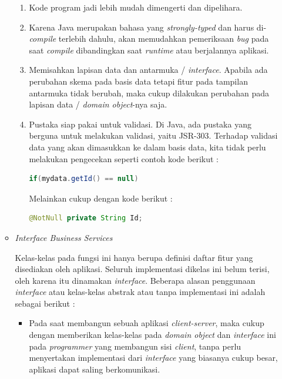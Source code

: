 \begin{enumerate}
\begin{itemize}
    \begin{enumerate}[1)]
      \item Kode program jadi lebih mudah dimengerti dan dipelihara.
      \item Karena Java merupakan bahasa yang \textit{strongly-typed} dan harus di-\textit{compile} terlebih dahulu, akan memudahkan pemeriksaan \textit{bug} pada saat \textit{compile} dibandingkan saat \textit{runtime} atau berjalannya aplikasi.
      \item Memisahkan lapisan data dan antarmuka / \textit{interface}. Apabila ada perubahan skema pada basis data tetapi fitur pada tampilan antarmuka tidak berubah, maka cukup dilakukan perubahan pada lapisan data / \textit{domain object}-nya saja.
      \item Pustaka siap pakai untuk validasi. Di Java, ada pustaka yang berguna untuk melakukan validasi, yaitu JSR-303. Terhadap validasi data yang akan dimasukkan ke dalam basis data, kita tidak perlu melakukan pengecekan seperti contoh kode berikut :
      
      \begin{lstlisting}[language=java]
      if(mydata.getId() == null)
      \end{lstlisting}
      
      Melainkan cukup dengan kode berikut :
      
      \begin{lstlisting}[language=java]
      @NotNull private String Id;
      \end{lstlisting}
    \end{enumerate}
    
    \item \textit{Interface Business Services}
    
    Kelas-kelas pada fungsi ini hanya berupa definisi daftar fitur yang disediakan oleh aplikasi. Seluruh implementasi dikelas ini belum terisi, oleh karena itu dinamakan \textit{interface}. Beberapa alasan penggunaan \textit{interface} atau kelas-kelas abstrak atau tanpa implementasi ini adalah sebagai berikut :
    
    \begin{itemize}
      \item Pada saat membangun sebuah aplikasi \textit{client-server}, maka cukup dengan memberikan kelas-kelas pada \textit{domain object} dan \textit{interface} ini pada \textit{programmer} yang membangun sisi \textit{client}, tanpa perlu menyertakan implementasi dari \textit{interface} yang biasanya cukup besar, aplikasi dapat saling berkomunikasi.
      

\end{itemize}
\end{itemize}
\end{enumerate}
